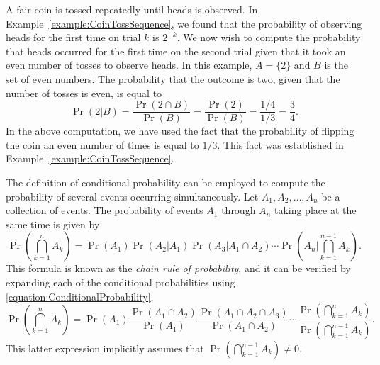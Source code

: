 \begin{example}
A fair coin is tossed repeatedly until heads is observed.
In Example~\ref{example:CoinTossSequence}, we found that the probability of observing heads for the first time on trial $k$ is $2^{-k}$.
We now wish to compute the probability that heads occurred for the first time on the second trial given that it took an even number of tosses to observe heads.
In this example, $A = \{ 2 \}$ and $B$ is the set of even numbers.
The probability that the outcome is two, given that the number of tosses is even, is equal to
\begin{equation*}
\Pr ( 2 | B )
= \frac{\Pr ( 2 \cap B )}{\Pr (B)}
= \frac{\Pr (2)}{\Pr (B)}
= \frac{1/4}{1/3}
= \frac{3}{4} .
\end{equation*}
In the above computation, we have used the fact that the probability of flipping the coin an even number of times is equal to $1/3$.
This fact was established in Example~\ref{example:CoinTossSequence}.
\end{example}

The definition of conditional probability can be employed to compute the probability of several events occurring simultaneously.
Let $A_1, A_2, \ldots, A_n$ be a collection of events.
The probability of events $A_1$ through $A_n$ taking place at the same time is given by
\begin{equation} \label{equation:SimultaneousEvents}
\Pr \left( \bigcap_{k=1}^n A_k \right)
= \Pr (A_1) \Pr (A_2 | A_1) \Pr (A_3 | A_1 \cap A_2)
\cdots \Pr \left( A_n \bigg| \bigcap_{k=1}^{n-1} A_k \right) .
\end{equation}
This formula is known as the \emph{chain rule of probability}, and it can be verified by expanding each of the conditional probabilities using \eqref{equation:ConditionalProbability},
\begin{equation*}
\Pr \left( \bigcap_{k=1}^n A_k \right)
= \Pr (A_1) \frac{\Pr (A_1 \cap A_2)}{\Pr (A_1)}
\frac{\Pr (A_1 \cap A_2 \cap A_3)}{\Pr (A_1 \cap A_2)}
\cdots \frac{\Pr \left( \bigcap_{k=1}^{n} A_k \right)}
{\Pr \left( \bigcap_{k=1}^{n-1} A_k \right)} .
\end{equation*}
This latter expression implicitly assumes that $\Pr \left( \bigcap_{k=1}^{n-1} A_k \right) \neq 0$.

